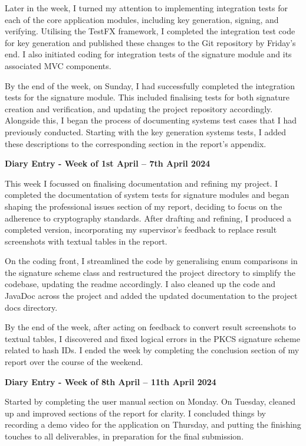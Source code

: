\documentclass[]{final_report}
\theoremstyle{definition}
\begin{document}
Later in the week, I turned my attention to implementing integration tests for each of the core application modules,
including key generation, signing, and verifying. Utilising the TestFX framework, I completed the integration test code
for key generation and published these changes to the Git repository by Friday's end. I also initiated coding for
integration  tests of the signature module and its associated MVC components.

By the end of the week, on Sunday, I had successfully completed the integration tests for the signature module. This
included finalising tests for both signature creation and verification, and updating the project repository accordingly.
Alongside this, I began the process of documenting systems test cases that I had previously conducted. Starting with the
key generation systems tests, I added these descriptions to the corresponding section in the report’s appendix.


\textbf{Diary Entry - Week of 1st April – 7th April 2024}

This week I focussed on finalising documentation and refining my project. I completed the documentation of
system tests for signature modules and began shaping the professional issues section of my report, deciding to focus on
the adherence to cryptography standards. After drafting and refining, I produced a completed version, incorporating my
supervisor's feedback to replace result screenshots with textual tables in the report.

On the coding front, I streamlined the code by generalising enum comparisons in the signature scheme class and
restructured the project directory to simplify the codebase, updating the readme accordingly. I also cleaned up the code
and JavaDoc across the project and added the updated documentation to the project docs directory.

By the end of the week, after acting on feedback to convert result screenshots to textual tables, I discovered and fixed
logical errors in the PKCS signature scheme related to hash IDs. I ended the week by completing the
conclusion section of my report over the course of the weekend.

\textbf{Diary Entry - Week of 8th April – 11th April 2024}

Started by completing the user manual section on Monday. On Tuesday, cleaned up and improved sections of the report for
clarity. I concluded things by recording a demo video for the application on Thursday, and putting the finishing touches to all
deliverables, in preparation for the final submission.


\cleardoublepage
{}
{}
\listoftables




\newpage

\printbibliography
\label{endpage}
\end{document}
